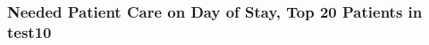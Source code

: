 % 


% 

\begin{frame}[fragile]
\frametitle{Needed Patient Care on Day of Stay, Top 20 Patients in test10}
\scalebox{0.5}{

}
\end{frame}


